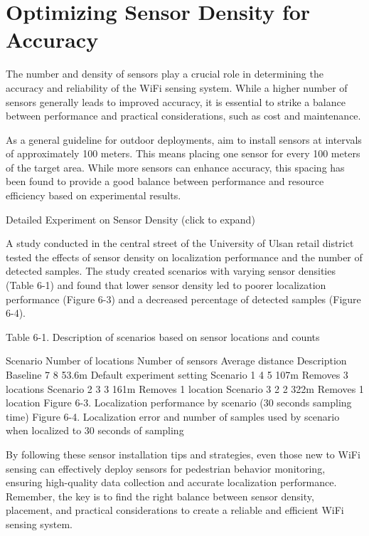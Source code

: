 \documentclass[
  letterpaper,
]{scrbook}
\begin{document}
\section{Optimizing Sensor Density for
Accuracy}\label{optimizing-sensor-density-for-accuracy}

The number and density of sensors play a crucial role in determining the
accuracy and reliability of the WiFi sensing system. While a higher
number of sensors generally leads to improved accuracy, it is essential
to strike a balance between performance and practical considerations,
such as cost and maintenance.

As a general guideline for outdoor deployments, aim to install sensors
at intervals of approximately 100 meters. This means placing one sensor
for every 100 meters of the target area. While more sensors can enhance
accuracy, this spacing has been found to provide a good balance between
performance and resource efficiency based on experimental results.

Detailed Experiment on Sensor Density (click to expand)

A study conducted in the central street of the University of Ulsan
retail district tested the effects of sensor density on localization
performance and the number of detected samples. The study created
scenarios with varying sensor densities (Table 6-1) and found that lower
sensor density led to poorer localization performance (Figure 6-3) and a
decreased percentage of detected samples (Figure 6-4).

Table 6-1. Description of scenarios based on sensor locations and counts

Scenario Number of locations Number of sensors Average distance
Description Baseline 7 8 53.6m Default experiment setting Scenario 1 4 5
107m Removes 3 locations Scenario 2 3 3 161m Removes 1 location Scenario
3 2 2 322m Removes 1 location Figure 6-3. Localization performance by
scenario (30 seconds sampling time) Figure 6-4. Localization error and
number of samples used by scenario when localized to 30 seconds of
sampling

By following these sensor installation tips and strategies, even those
new to WiFi sensing can effectively deploy sensors for pedestrian
behavior monitoring, ensuring high-quality data collection and accurate
localization performance. Remember, the key is to find the right balance
between sensor density, placement, and practical considerations to
create a reliable and efficient WiFi sensing system.
\end{document}
